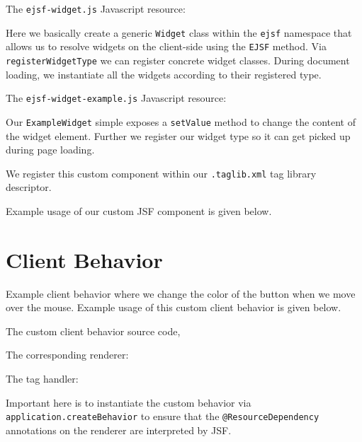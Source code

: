 The \texttt{ejsf-widget.js} Javascript resource:

Here we basically create a generic \texttt{Widget} class within the \texttt{ejsf} namespace that allows us to resolve widgets on the client-side using the \texttt{EJSF} method.
Via \texttt{registerWidgetType} we can register concrete widget classes.
During document loading, we instantiate all the widgets according to their registered type.

The \texttt{ejsf-widget-example.js} Javascript resource:

Our \texttt{ExampleWidget} simple exposes a \texttt{setValue} method to change the content of the widget element.
Further we register our widget type so it can get picked up during page loading.

We register this custom component within our \texttt{.taglib.xml} tag library descriptor.


Example usage of our custom JSF component is given below.


\section{Client Behavior}
Example client behavior where we change the color of the button when we move over the mouse.
Example usage of this custom client behavior is given below.


The custom client behavior source code,


The corresponding renderer:


The tag handler:

Important here is to instantiate the custom behavior via \texttt{application.createBehavior} to ensure that the \texttt{@ResourceDependency} annotations on the renderer are interpreted by JSF.

